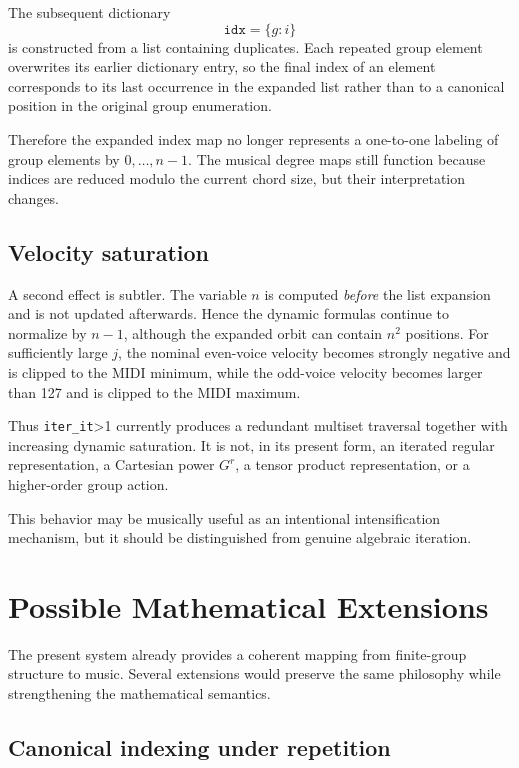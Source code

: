 \documentclass[11pt,a4paper]{article}
\begin{document}
The subsequent dictionary
\[
\texttt{idx}=\{g:i\}
\]
is constructed from a list containing duplicates. Each repeated group element overwrites its earlier dictionary entry, so the final index of an element corresponds to its last occurrence in the expanded list rather than to a canonical position in the original group enumeration.

Therefore the expanded index map no longer represents a one-to-one labeling of group elements by $0,\ldots,n-1$. The musical degree maps still function because indices are reduced modulo the current chord size, but their interpretation changes.

\subsection{Velocity saturation}

A second effect is subtler. The variable $n$ is computed \emph{before} the list expansion and is not updated afterwards. Hence the dynamic formulas continue to normalize by $n-1$, although the expanded orbit can contain $n^2$ positions. For sufficiently large $j$, the nominal even-voice velocity becomes strongly negative and is clipped to the MIDI minimum, while the odd-voice velocity becomes larger than 127 and is clipped to the MIDI maximum.

Thus \texttt{iter\_it}>1 currently produces a redundant multiset traversal together with increasing dynamic saturation. It is not, in its present form, an iterated regular representation, a Cartesian power $G^r$, a tensor product representation, or a higher-order group action.

This behavior may be musically useful as an intentional intensification mechanism, but it should be distinguished from genuine algebraic iteration.

\section{Possible Mathematical Extensions}

The present system already provides a coherent mapping from finite-group structure to music. Several extensions would preserve the same philosophy while strengthening the mathematical semantics.

\subsection{Canonical indexing under repetition}
\end{document}

